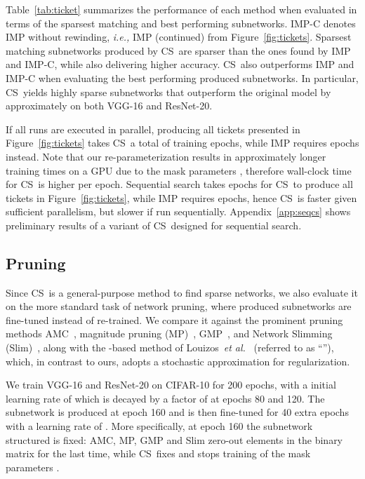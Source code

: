 \documentclass{article}
\newcommand{\ie}{\textit{i.e.,} }
\newcommand{\etal}{\textit{et al.}}
\newcommand{\methodacro}{CS}
\begin{document}
Table~\ref{tab:ticket} summarizes the performance of each method when evaluated in terms of the sparsest matching and best performing subnetworks. IMP-C denotes IMP without rewinding, \ie IMP (continued) from Figure~\ref{fig:tickets}. Sparsest matching subnetworks produced by \methodacro~are sparser than the ones found by IMP and IMP-C, while also delivering higher accuracy. \methodacro~also outperforms IMP and IMP-C when evaluating the best performing produced subnetworks. In particular, \methodacro~yields highly sparse subnetworks that outperform the original model by approximately  on both VGG-16 and ResNet-20.

If all runs are executed in parallel, producing all tickets presented in Figure~\ref{fig:tickets} takes \methodacro~a total of  training epochs, while IMP requires  epochs instead. Note that our re-parameterization results in approximately  longer training times on a GPU due to the mask parameters , therefore wall-clock time for \methodacro~is  higher per epoch. Sequential search takes  epochs for \methodacro~to produce all tickets in Figure~\ref{fig:tickets}, while IMP requires  epochs, hence \methodacro~is faster given sufficient parallelism, but slower if run sequentially. Appendix~\ref{app:seqcs} shows preliminary results of a variant of \methodacro~designed for sequential search.

\subsection{Pruning}
\label{seq-pruning}

Since \methodacro~is a general-purpose method to find sparse networks, we also evaluate it on the more standard task of network pruning, where produced subnetworks are fine-tuned instead of re-trained. We compare it against the prominent pruning methods AMC~\cite{amc}, magnitude pruning (MP)~\cite{magnitudepruning}, GMP~\cite{gmp}, and Network Slimming (Slim)~\cite{slim}, along with the -based method of Louizos~\etal~\cite{sparsityl0} (referred to as ``''), which, in contrast to ours, adopts a stochastic approximation for  regularization.

We train VGG-16 and ResNet-20 on CIFAR-10 for 200 epochs, with a initial learning rate of  which is decayed by a factor of  at epochs 80 and 120. The subnetwork is produced at epoch 160 and is then fine-tuned for 40 extra epochs with a learning rate of . More specifically, at epoch 160 the subnetwork structured is fixed: AMC, MP, GMP and Slim zero-out elements in the binary matrix  for the last time, while \methodacro~fixes  and stops training of the mask parameters .
\end{document}
